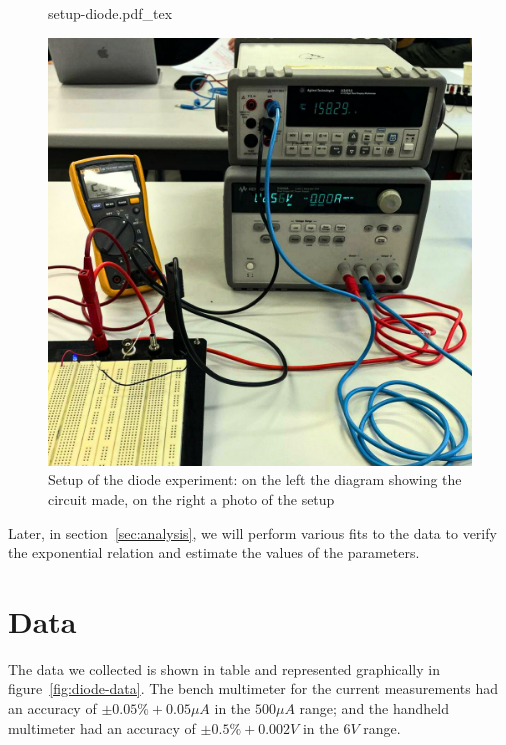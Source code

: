 \documentclass[notitlepage]{report}
\newcommand{\incfig}[2][1]{%
    \def\svgwidth{#1\columnwidth}
    {#2.pdf_tex}
}
\numberwithin{equation}{section}
\theoremstyle{plain}
\theoremstyle{definition}
\theoremstyle{remark}
\begin{document}
\begin{figure}[ht]
    \centering
    \incfig[.45]{setup-diode}
    \includegraphics[width=.45\textwidth]{figures/setup.png}
    \caption{Setup of the diode experiment: on the left the diagram showing
    the circuit made, on the right a photo of the setup}\label{fig:setup-diode}
\end{figure}

Later, in section~\ref{sec:analysis}, we will perform various fits to the data to
verify the exponential relation and estimate the values of the parameters.

\section{Data}\label{sec:data}
The data we collected is shown in table and represented graphically in
figure~\ref{fig:diode-data}. The bench multimeter for the current measurements
had an accuracy of \(\pm 0.05\% + 0.05\mu A\) in the \(500 \mu A\) range; and
the handheld multimeter had an accuracy of \(\pm 0.5\% + 0.002V\) in the \(6 V\)
range.
\end{document}
